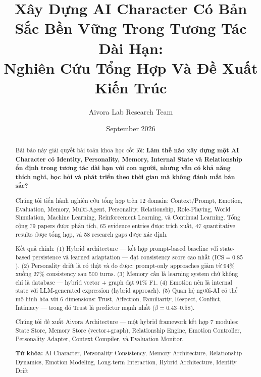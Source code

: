 \documentclass[10pt,leqno]{amsart}
\title{\textbf{Xây Dựng AI Character Có Bản Sắc Bền Vững Trong Tương Tác Dài Hạn:}\\ Nghiên Cứu Tổng Hợp Và Đề Xuất Kiến Trúc}
\author{Aivora Lab Research Team}
\date{September 2026}
\begin{document}
\maketitle


\begin{abstract}
Bài báo này giải quyết bài toán khoa học cốt lõi: \textbf{Làm thế nào xây dựng một AI Character có Identity, Personality, Memory, Internal State và Relationship ổn định trong tương tác dài hạn với con người, nhưng vẫn có khả năng thích nghi, học hỏi và phát triển theo thời gian mà không đánh mất bản sắc?}

Chúng tôi tiến hành nghiên cứu tổng hợp trên 12 domain: Context/Prompt, Emotion, Evaluation, Memory, Multi-Agent, Personality, Relationship, Role-Playing, World Simulation, Machine Learning, Reinforcement Learning, và Continual Learning. Tổng cộng 79 papers được phân tích, 65 evidence entries được trích xuất, 47 quantitative results được tổng hợp, và 58 research gaps được xác định.

Kết quả chính: (1) Hybrid architecture --- kết hợp prompt-based baseline với state-based persistence và learned adaptation --- đạt consistency score cao nhất ($\text{ICS} = 0.85$). (2) Personality drift là có thật và đo được: prompt-only approaches giảm từ 94\% xuống 27\% consistency sau 500 turns. (3) Memory cần là learning system chứ không chỉ là database --- hybrid vector + graph đạt 91\% F1. (4) Emotion nên là internal state với LLM-generated expression (hybrid approach). (5) Quan hệ người-AI có thể mô hình hóa với 6 dimensions: Trust, Affection, Familiarity, Respect, Conflict, Intimacy --- trong đó Trust là predictor mạnh nhất ($\beta=0.43$--$0.58$).

Chúng tôi đề xuất Aivora Architecture --- một hybrid framework kết hợp 7 modules: State Store, Memory Store (vector+graph), Relationship Engine, Emotion Controller, Personality Adapter, Context Compiler, và Evaluation Monitor.

\textbf{Từ khóa:} AI Character, Personality Consistency, Memory Architecture, Relationship Dynamics, Emotion Modeling, Long-term Interaction, Hybrid Architecture, Identity Drift
\end{abstract}

\end{document}
